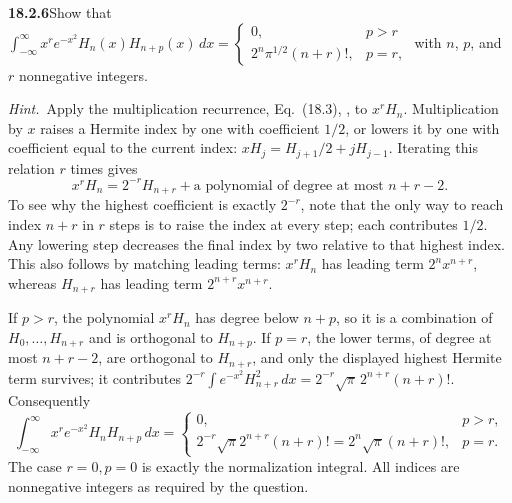 \par\bigskip
\noindent\textbf{18.2.6}\quad Show that
$\displaystyle\int_{-\infty}^{\infty}x^{r}e^{-x^{2}}
H_{n}(x)H_{n+p}(x)\,dx
=\begin{cases}
0, & p>r\\
2^{n}\pi^{1/2}(n+r)!, & p=r,
\end{cases}$
with $n$, $p$, and $r$ nonnegative integers.
\par\emph{Hint.}~Apply the multiplication recurrence, Eq.~(18.3), , to $x^rH_n$.
\solution
{}
Multiplication by $x$ raises a Hermite index by one with coefficient
$1/2$, or lowers it by one with coefficient equal to the current index:
$xH_j=H_{j+1}/2+jH_{j-1}$.  Iterating this relation $r$ times gives
\[
x^rH_n=2^{-r}H_{n+r}
       +\text{a polynomial of degree at most }n+r-2.
\]
To see why the highest coefficient is exactly $2^{-r}$, note that the only
way to reach index $n+r$ in $r$ steps is to raise the index at every
step; each contributes $1/2$.  Any lowering step decreases the final
index by two relative to that highest index.  This also follows by
matching leading terms: $x^rH_n$ has leading term $2^nx^{n+r}$,
whereas $H_{n+r}$ has leading term $2^{n+r}x^{n+r}$.

If $p>r$, the polynomial $x^rH_n$ has degree below $n+p$, so it is a
combination of $H_0,\ldots,H_{n+r}$ and is orthogonal to $H_{n+p}$.
If $p=r$, the lower terms, of degree at most $n+r-2$, are orthogonal
to $H_{n+r}$, and only the displayed highest Hermite term survives;
it contributes $2^{-r}\int e^{-x^2}H_{n+r}^2\,dx
=2^{-r}\sqrt\pi\,2^{n+r}(n+r)!$.  Consequently
\[
\boxed{\int_{-\infty}^{\infty}x^re^{-x^2}H_nH_{n+p}\,dx
 =\begin{cases}
 0,&p>r,\\
 2^{-r}\sqrt\pi2^{n+r}(n+r)!
 =2^n\sqrt\pi(n+r)!,&p=r.
 \end{cases}}
\]
The case $r=0,p=0$ is exactly the normalization integral.  All indices
are nonnegative integers as required by the question.


